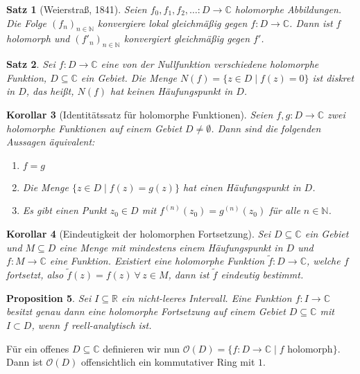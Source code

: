 \documentclass[a4paper,12pt]{book}
\theoremstyle{newthm}
\newtheorem{thm}{Satz}[section]
\newtheorem{prop}[thm]{Proposition}
\newtheorem{cor}[thm]{Korollar}
\theoremstyle{newdef}
\theoremstyle{newrem}
\newcommand{\N}{\mathbb{N}}
\newcommand{\R}{\mathbb{R}}
\newcommand{\C}{\mathbb{C}}
\renewcommand{\O}{\mathcal{O}}
\begin{document}
		\begin{thm}[Weierstraß, 1841]\label{2.5.1}
			Seien $ f_0,f_1,f_2,\dots: D \to \C $ holomorphe Abbildungen. Die Folge $ (f_n)_{n \in  \N} $ konvergiere lokal gleichmäßig gegen $f: D \to \C$. Dann ist $f$ holomorph und $ (f'_n)_{n \in \N} $ konvergiert gleichmäßig gegen $f'$.
		\end{thm}
		
		\begin{thm}
			Sei $f: D \to \C$ eine von der Nullfunktion verschiedene holomorphe Funktion, $D \subseteq \C$ ein Gebiet. Die Menge $N(f) = \{z \in D \mid f(z) = 0\}$ ist diskret in $D$, das heißt, $N(f)$ hat keinen Häufungspunkt in $D$. 
		\end{thm}
		
		\begin{cor}[Identitätssatz für holomorphe Funktionen]
			Seien $f,g: D \to \C$ zwei holomorphe Funktionen auf einem Gebiet $ D \neq \emptyset $. Dann sind die folgenden Aussagen äquivalent:
			\begin{enumerate}[label={\roman*})]
				\item $f=g$
				\item Die Menge $ \{z \in D \mid f(z)=g(z)\} $ hat einen Häufungspunkt in $D$.
				\item Es gibt einen Punkt $z_0 \in D$ mit $ f^{(n)}(z_0) = g^{(n)}(z_0) $ für alle $n \in \N$.
			\end{enumerate}
		\end{cor}
		
		\begin{cor}[Eindeutigkeit der holomorphen Fortsetzung]
			Sei $D \subseteq \C$ ein Gebiet und $M \subseteq D$ eine Menge mit mindestens einem Häufungspunkt in $D$ und $f: M \to \C$ eine Funktion. Existiert eine holomorphe Funktion $\tilde{f}: D \to \C$, welche $f$ fortsetzt, also $\tilde{f}(z) = f(z) \ \forall\, z \in M$, dann ist $\tilde{f}$ eindeutig bestimmt.
		\end{cor}
		
		\begin{prop}
			Sei $I \subseteq \R $ ein nicht-leeres Intervall. Eine Funktion $ f: I \to \C $ besitzt genau dann eine holomorphe Fortsetzung auf einem Gebiet $ D \subseteq \C $ mit $ I \subset D $, wenn $f$ reell-analytisch ist.
		\end{prop}
		
		Für ein offenes $D \subseteq \C$ definieren wir nun $ \O(D) = \{ f: D \to \C \mid f $ holomorph$ \} $. Dann ist $ \O(D) $ offensichtlich ein kommutativer Ring mit $1$.
			
\end{document}
